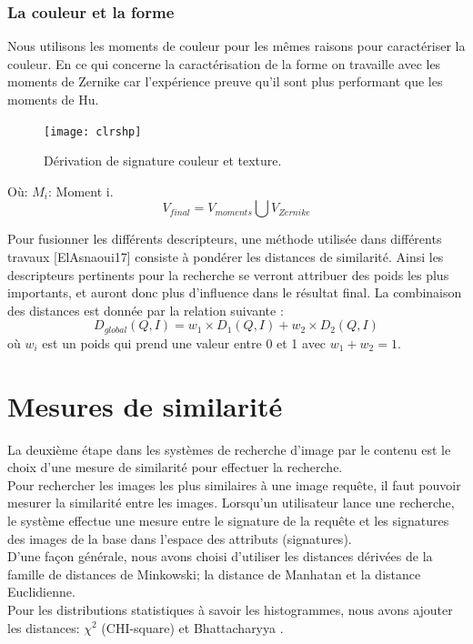 \subsubsection{La couleur et la forme}
Nous utilisons les moments de couleur pour les mêmes raisons pour caractériser la couleur. En ce qui concerne la caractérisation de la forme on travaille avec les moments de Zernike car l'expérience preuve qu'il sont plus performant que les moments de Hu.
\begin{figure}[H]
	\centering
	\texttt{[image: clrshp]}
	\caption{Dérivation de signature couleur et texture.}
\end{figure}
Où: 
$ M_i $: Moment i.
\begin{equation}
V_{final} = V_{moments} \bigcup V_{Zernike}
\end{equation}

Pour fusionner les différents descripteurs, une méthode utilisée dans différents travaux [ElAsnaoui17] consiste à pondérer les distances de similarité. Ainsi les descripteurs pertinents pour la recherche se verront attribuer des poids les plus importants, et auront donc plus d’influence dans le résultat final. La combinaison des distances est donnée par la relation suivante :
\begin{equation}
	D_{global}(Q, I) = w_1 \times 	D_{1}(Q, I) + w_2 \times 	D_{2}(Q, I)
\end{equation}
où $ w_i $ est un poids qui prend une valeur entre 0 et 1 avec $ w_1+w_2= 1 $.
\section{Mesures de similarité}
La deuxième étape dans les systèmes de recherche d'image par le contenu est le choix d'une mesure de similarité pour effectuer la recherche.\\

Pour rechercher les images les plus similaires à une image requête, il faut pouvoir mesurer la similarité entre les images. Lorsqu’un utilisateur lance une recherche, le système effectue une mesure entre le signature de la requête et les signatures des images de la base dans l’espace des attributs (signatures).\\

D'une façon générale, nous avons choisi d’utiliser les distances dérivées de la famille de distances de Minkowski; la distance de Manhatan et la distance Euclidienne.\\

Pour les distributions statistiques à savoir les histogrammes, nous avons ajouter les distances:  $\chi^2$ (CHI-square) et Bhattacharyya  .

